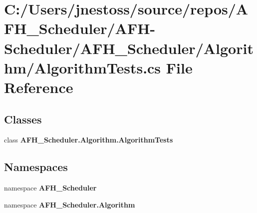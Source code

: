 \section{C\+:/\+Users/jnestoss/source/repos/\+A\+F\+H\+\_\+\+Scheduler/\+A\+F\+H-\/\+Scheduler/\+A\+F\+H\+\_\+\+Scheduler/\+Algorithm/\+Algorithm\+Tests.cs File Reference}
\label{_algorithm_tests_8cs}
\subsection*{Classes}
\begin{DoxyCompactItemize}
\item 
class \textbf{ A\+F\+H\+\_\+\+Scheduler.\+Algorithm.\+Algorithm\+Tests}
\end{DoxyCompactItemize}
\subsection*{Namespaces}
\begin{DoxyCompactItemize}
\item 
namespace \textbf{ A\+F\+H\+\_\+\+Scheduler}
\item 
namespace \textbf{ A\+F\+H\+\_\+\+Scheduler.\+Algorithm}
\end{DoxyCompactItemize}
